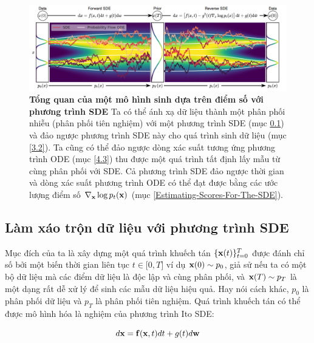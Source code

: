\documentclass{article} %
\begin{document}
\begin{figure}[h!]
    \centering
    \includegraphics[width=\textwidth]{2.png}
    \caption{\textbf{Tổng quan của một mô hình sinh dựa trên điểm số với phương trình SDE}
    Ta có thể ánh xạ dữ liệu thành một phân phối nhiễu (phân phối tiên nghiệm) với một phương trình SDE (mục \ref{Pertubring-data-with-SDE}) và đảo ngược phương trình SDE này cho quá trình sinh dữ liệu (mục \ref{3.2}).
    Ta cũng có thể đảo ngược dòng xác suất tương ứng phương trình ODE (mục \ref{4.3}) thu được một quá trình tất định lấy mẫu từ cùng phân phối với SDE.
    Cả phương trình SDE đảo ngược thời gian và dòng xác suất phương trình ODE có thể đạt được bằng các ước lượng điểm số $\nabla_{\bold{x}} \log p_t (\bold{x})$ (mục \ref{Estimating-Scores-For-The-SDE}).}
    \label{fig:2}
\end{figure}

\subsection{Làm xáo trộn dữ liệu với phương trình SDE} \label{Pertubring-data-with-SDE} \label{2.3}

Mục đích của ta là xây dựng một quá trình khuếch tán $\lbrace \bold{x}(t) \rbrace_{t=0}^T$ được đánh chỉ số bởi một biến thời gian liên tục $t \in \lbrack 0, T \rbrack$ ví dụ $\bold{x}(0) \sim p_0$, giả sử nếu ta có một bộ dữ liệu mà các điểm dữ liệu là độc lập và cùng phân phối, và $\bold{x}(T) \sim p_T$ là một dạng rất dễ xử lý để sinh các mẫu dữ liệu hiệu quả.
Hay nói cách khác, $p_0$ là phân phối dữ liệu và $p_T$ là phân phối tiên nghiệm.
Quá trình khuếch tán có thể được mô hình hóa là nghiệm của phương trình Ito SDE:

\begin{equation} \label{eq:5}
    d \bold{x} = \bold{f} (\bold{x}, t) dt + g(t) d \bold{w}
\end{equation}
\end{document}
